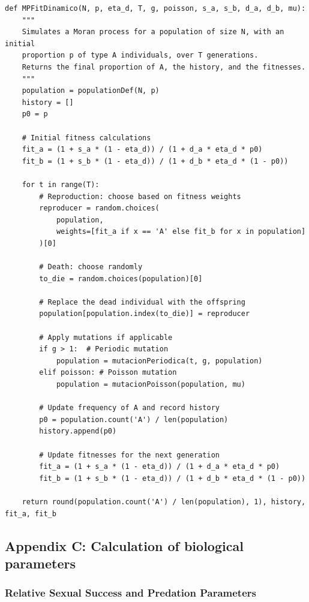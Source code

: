 \begin{verbatim}
def MPFitDinamico(N, p, eta_d, T, g, poisson, s_a, s_b, d_a, d_b, mu):
    """
    Simulates a Moran process for a population of size N, with an initial 
    proportion p of type A individuals, over T generations.
    Returns the final proportion of A, the history, and the fitnesses.
    """
    population = populationDef(N, p)
    history = []
    p0 = p 
    
    # Initial fitness calculations
    fit_a = (1 + s_a * (1 - eta_d)) / (1 + d_a * eta_d * p0)
    fit_b = (1 + s_b * (1 - eta_d)) / (1 + d_b * eta_d * (1 - p0))

    for t in range(T):
        # Reproduction: choose based on fitness weights
        reproducer = random.choices(
            population,
            weights=[fit_a if x == 'A' else fit_b for x in population]
        )[0]
        
        # Death: choose randomly
        to_die = random.choices(population)[0]
        
        # Replace the dead individual with the offspring
        population[population.index(to_die)] = reproducer 
        
        # Apply mutations if applicable
        if g > 1:  # Periodic mutation
            population = mutacionPeriodica(t, g, population)
        elif poisson: # Poisson mutation
            population = mutacionPoisson(population, mu)
            
        # Update frequency of A and record history
        p0 = population.count('A') / len(population)
        history.append(p0)
        
        # Update fitnesses for the next generation
        fit_a = (1 + s_a * (1 - eta_d)) / (1 + d_a * eta_d * p0)
        fit_b = (1 + s_b * (1 - eta_d)) / (1 + d_b * eta_d * (1 - p0))

    return round(population.count('A') / len(population), 1), history, fit_a, fit_b
\end{verbatim}

\subsection*{Appendix C: Calculation of biological parameters}
\label{sec: Appendix Sa, Sb, Da, Db, mutation}

\subsubsection*{Relative Sexual Success and Predation Parameters}

